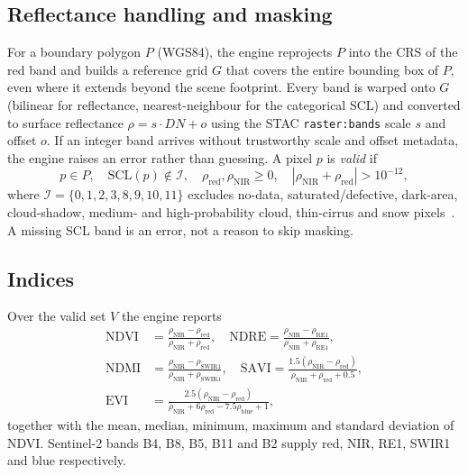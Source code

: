 \documentclass[conference]{IEEEtran}
\newcommand{\NDVI}{\mathrm{NDVI}}
\begin{document}
\subsection{Reflectance handling and masking}
For a boundary polygon $P$ (WGS84), the engine reprojects $P$ into the CRS of the red band and builds a reference grid $G$ that covers the entire bounding box of $P$, even where it extends beyond the scene footprint. Every band is warped onto $G$ (bilinear for reflectance, nearest-neighbour for the categorical SCL) and converted to surface reflectance $\rho = s\cdot DN + o$ using the STAC \texttt{raster:bands} scale $s$ and offset $o$. If an integer band arrives without trustworthy scale and offset metadata, the engine raises an error rather than guessing. A pixel $p$ is \emph{valid} if
\begin{equation}
p \in P,\quad \mathrm{SCL}(p) \notin \mathcal{I},\quad \rho_{\mathrm{red}},\rho_{\mathrm{NIR}} \ge 0,\quad |\rho_{\mathrm{NIR}}+\rho_{\mathrm{red}}| > 10^{-12},
\end{equation}
where $\mathcal{I}=\{0,1,2,3,8,9,10,11\}$ excludes no-data, saturated/defective, dark-area, cloud-shadow, medium- and high-probability cloud, thin-cirrus and snow pixels~\cite{mainknorn2017}. A missing SCL band is an error, not a reason to skip masking.

\subsection{Indices}
Over the valid set $V$ the engine reports
\begin{align}
\NDVI &= \frac{\rho_{\mathrm{NIR}}-\rho_{\mathrm{red}}}{\rho_{\mathrm{NIR}}+\rho_{\mathrm{red}}}, \quad
\mathrm{NDRE} = \frac{\rho_{\mathrm{NIR}}-\rho_{\mathrm{RE1}}}{\rho_{\mathrm{NIR}}+\rho_{\mathrm{RE1}}},\\
\mathrm{NDMI} &= \frac{\rho_{\mathrm{NIR}}-\rho_{\mathrm{SWIR1}}}{\rho_{\mathrm{NIR}}+\rho_{\mathrm{SWIR1}}}, \quad
\mathrm{SAVI} = \frac{1.5(\rho_{\mathrm{NIR}}-\rho_{\mathrm{red}})}{\rho_{\mathrm{NIR}}+\rho_{\mathrm{red}}+0.5},\\
\mathrm{EVI} &= \frac{2.5(\rho_{\mathrm{NIR}}-\rho_{\mathrm{red}})}{\rho_{\mathrm{NIR}}+6\rho_{\mathrm{red}}-7.5\rho_{\mathrm{blue}}+1},
\end{align}
together with the mean, median, minimum, maximum and standard deviation of NDVI. Sentinel-2 bands B4, B8, B5, B11 and B2 supply red, NIR, RE1, SWIR1 and blue respectively.
\end{document}

